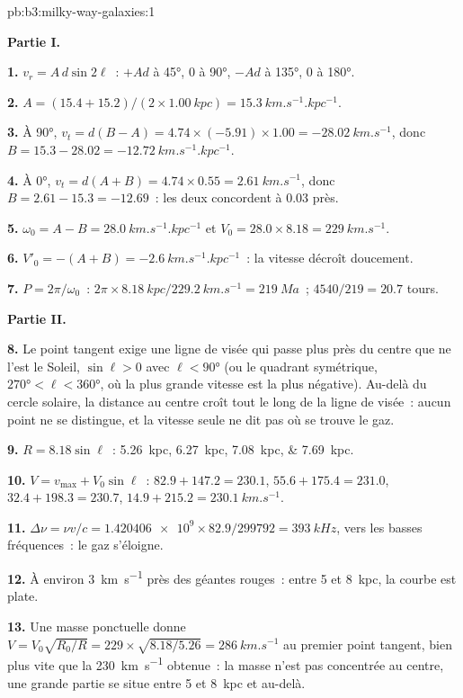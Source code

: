 \begin{solution}{pb:b3:milky-way-galaxies:1}

\textbf{Partie I.}

\textbf{1.} $v_r = A\,d\sin2\ell$~: $+A d$ à \ang{45}, 0 à \ang{90}, $-A d$ à
\ang{135}, 0 à \ang{180}.

\textbf{2.} $A = (15.4 + 15.2)/(2\times\qty{1.00}{kpc}) =
\qty{15.3}{km.s^{-1}.kpc^{-1}}$.

\textbf{3.} À \ang{90}, $v_t = d(B - A) = 4.74\times(-5.91)\times1.00 =
\qty{-28.02}{km.s^{-1}}$, donc $B = 15.3 - 28.02 =
\qty{-12.72}{km.s^{-1}.kpc^{-1}}$.

\textbf{4.} À \ang{0}, $v_t = d(A + B) = 4.74\times0.55 =
\qty{2.61}{km.s^{-1}}$, donc $B = 2.61 - 15.3 = \num{-12.69}$~: les deux
concordent à \num{0.03} près.

\textbf{5.} $\omega_0 = A - B = \qty{28.0}{km.s^{-1}.kpc^{-1}}$ et
$V_0 = 28.0\times8.18 = \qty{229}{km.s^{-1}}$.

\textbf{6.} $V'_0 = -(A + B) = \qty{-2.6}{km.s^{-1}.kpc^{-1}}$~: la vitesse décroît doucement.

\textbf{7.} $P = 2\pi/\omega_0$~: $2\pi\times\qty{8.18}{kpc}/\qty{229.2}{km.s^{-1}}
= \qty{219}{Ma}$~; $4540/219 = 20.7$ tours.

\textbf{Partie II.}

\textbf{8.} Le point tangent exige une ligne de visée qui passe plus près du
centre que ne l'est le Soleil, $\sin\ell > 0$ avec $\ell < \ang{90}$ (ou le
quadrant symétrique, $\ang{270} < \ell < \ang{360}$, où la plus grande
vitesse est la plus négative). Au-delà du cercle solaire, la distance
au centre croît tout le long de la ligne de visée~: aucun point ne
se distingue, et la vitesse seule ne dit pas où se trouve le gaz.

\textbf{9.} $R = 8.18\sin\ell$~: \qtylist{5.26;6.27;7.08;7.69}{kpc}.

\textbf{10.} $V = v_\mathrm{max} + V_0\sin\ell$~: $82.9 + 147.2 = 230.1$,
$55.6 + 175.4 = 231.0$, $32.4 + 198.3 = 230.7$, $14.9 + 215.2 =
\qty{230.1}{km.s^{-1}}$.

\textbf{11.} $\Delta\nu = \nu v/c = \num{1.420406e9}\times82.9/299792 =
\qty{393}{kHz}$, vers les basses fréquences~: le gaz s'éloigne.

\textbf{12.} À environ \qty{3}{km.s^{-1}} près des géantes rouges~: entre 5 et
\qty{8}{kpc}, la courbe est plate.

\textbf{13.} Une masse ponctuelle donne $V = V_0\sqrt{R_0/R} = 229\times\sqrt{8.18/5.26} =
\qty{286}{km.s^{-1}}$ au premier point tangent, bien plus vite que la
\qty{230}{km.s^{-1}} obtenue~: la masse n'est pas concentrée au centre,
une grande partie se situe entre 5 et \qty{8}{kpc} et au-delà.


\end{solution}
